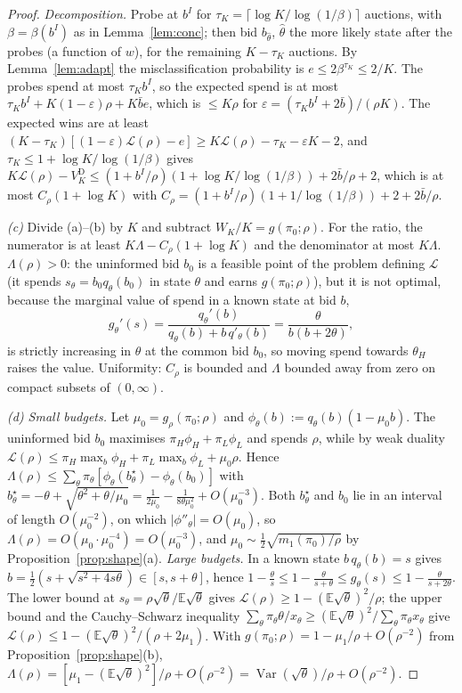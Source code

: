 \documentclass[11pt]{article}
\theoremstyle{definition}
\theoremstyle{remark}
\newcommand{\E}{\mathbb{E}}
\DeclareMathOperator{\Var}{Var}
\begin{document}
\begin{proof}
\emph{Decomposition.} Probe at $b^I$ for $\tau_K=\lceil\log K/\log(1/\beta)\rceil$ auctions, with $\beta=\beta(b^I)$ as
in Lemma~\ref{lem:conc}; then bid $b_{\hat\theta}$, $\hat\theta$ the more likely state after the probes (a function of
$w$), for the remaining $K-\tau_K$ auctions. By Lemma~\ref{lem:adapt} the misclassification probability is
$e\le2\beta^{\tau_K}\le2/K$. The probes spend at most $\tau_Kb^I$, so the expected spend is at most
$\tau_Kb^I+K(1-\varepsilon)\rho+K\bar be$, which is $\le K\rho$ for $\varepsilon=(\tau_Kb^I+2\bar b)/(\rho K)$. The expected wins
are at least $(K-\tau_K)[(1-\varepsilon)\mathcal L(\rho)-e]\ge K\mathcal L(\rho)-\tau_K-\varepsilon K-2$, and
$\tau_K\le1+\log K/\log(1/\beta)$ gives $K\mathcal L(\rho)-V^{\mathrm D}_K\le(1+b^I/\rho)(1+\log K/\log(1/\beta))+2\bar b/\rho+2$,
which is at most $C_\rho(1+\log K)$ with $C_\rho=(1+b^I/\rho)(1+1/\log(1/\beta))+2+2\bar b/\rho$.

\emph{(c)} Divide (a)--(b) by $K$ and subtract $W_K/K=g(\pi_0;\rho)$. For the ratio, the numerator is at least
$K\Lambda-C_\rho(1+\log K)$ and the denominator at most $K\Lambda$. $\Lambda(\rho)>0$: the uninformed bid $b_0$ is a
feasible point of the problem defining $\mathcal L$ (it spends $s_\theta=b_0q_\theta(b_0)$ in state $\theta$ and earns
$g(\pi_0;\rho)$), but it is not optimal, because the marginal value of spend in a known state at bid $b$,
\[
g_\theta'(s)=\frac{q_\theta'(b)}{q_\theta(b)+b\,q'_\theta(b)}=\frac{\theta}{b(b+2\theta)},
\]
is strictly increasing in $\theta$ at the common bid $b_0$, so moving spend towards $\theta_H$ raises the value.
Uniformity: $C_\rho$ is bounded and $\Lambda$ bounded away from zero on compact subsets of $(0,\infty)$.

\emph{(d) Small budgets.} Let $\mu_0=g_\rho(\pi_0;\rho)$ and $\phi_\theta(b):=q_\theta(b)(1-\mu_0b)$. The uninformed bid
$b_0$ maximises $\pi_H\phi_H+\pi_L\phi_L$ and spends $\rho$, while by weak duality
$\mathcal L(\rho)\le\pi_H\max_b\phi_H+\pi_L\max_b\phi_L+\mu_0\rho$. Hence
$\Lambda(\rho)\le\sum_\theta\pi_\theta[\phi_\theta(b^\star_\theta)-\phi_\theta(b_0)]$ with
$b^\star_\theta=-\theta+\sqrt{\theta^2+\theta/\mu_0}=\tfrac1{2\mu_0}-\tfrac1{8\theta\mu_0^2}+O(\mu_0^{-3})$. Both $b^\star_\theta$ and
$b_0$ lie in an interval of length $O(\mu_0^{-2})$, on which $|\phi''_\theta|=O(\mu_0)$, so
$\Lambda(\rho)=O(\mu_0\cdot\mu_0^{-4})=O(\mu_0^{-3})$, and $\mu_0\sim\tfrac12\sqrt{m_1(\pi_0)/\rho}$ by
Proposition~\ref{prop:shape}(a). \emph{Large budgets.} In a known state $b\,q_\theta(b)=s$ gives
$b=\tfrac12(s+\sqrt{s^2+4s\theta})\in[s,s+\theta]$, hence $1-\tfrac{\theta}{s}\le1-\tfrac{\theta}{s+\theta}\le g_\theta(s)\le1-\tfrac{\theta}{s+2\theta}$.
The lower bound at $s_\theta=\rho\sqrt\theta/\E\sqrt\theta$ gives $\mathcal L(\rho)\ge1-(\E\sqrt\theta)^2/\rho$; the upper bound and
the Cauchy--Schwarz inequality $\sum_\theta\pi_\theta\theta/x_\theta\ge(\E\sqrt\theta)^2/\sum_\theta\pi_\theta x_\theta$ give
$\mathcal L(\rho)\le1-(\E\sqrt\theta)^2/(\rho+2\mu_1)$. With $g(\pi_0;\rho)=1-\mu_1/\rho+O(\rho^{-2})$ from
Proposition~\ref{prop:shape}(b), $\Lambda(\rho)=[\mu_1-(\E\sqrt\theta)^2]/\rho+O(\rho^{-2})=\Var(\sqrt\theta)/\rho+O(\rho^{-2})$.


\end{proof}
\end{document}
